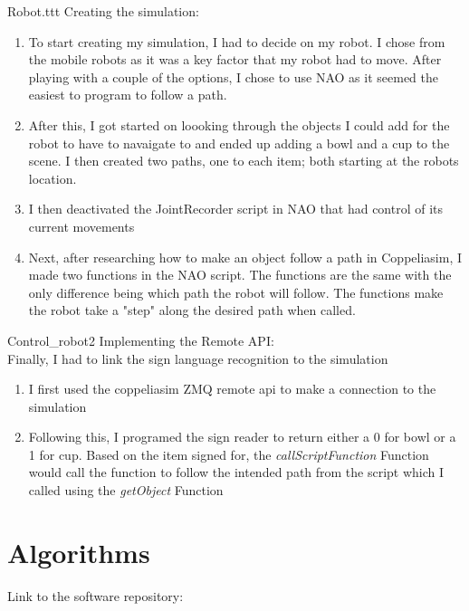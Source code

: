 \documentclass[lettersize,journal]{IEEEtran}
\begin{document}
Robot.ttt Creating the simulation: 
\begin{enumerate}
\item{ To start creating my simulation, I had to decide on my robot. I chose from the mobile robots as it was a key factor that my robot had to move. After playing with a couple of the options, I chose to use NAO as it seemed the easiest to program to follow a path.   }
\item{ After this, I got started on loooking through the objects I could add for the robot to have to navaigate to and ended up adding a bowl and a cup to the scene. I then created two paths, one to each item; both starting at the robots location.}
\item{I then deactivated the JointRecorder script in NAO that had control of its current movements }
\item{Next, after researching how to make an object follow a path in Coppeliasim, I made two functions in the NAO script. The functions are the same with the only difference being which path the robot will follow. The functions make the robot take a "step" along the desired path when called.  }
\end{enumerate}

Control\_robot2 Implementing the Remote API: 
\\
Finally, I had to link the sign language recognition to the simulation 
\begin{enumerate}
\item{ I first used the coppeliasim ZMQ remote api to make a connection to the simulation}
\item{Following this,  I programed the sign reader to return either a 0 for bowl or a 1 for cup. Based on the item signed for, the {\it{ callScriptFunction}} Function would call the function to follow the intended path from the script which I called using the {\it{ getObject} }Function }

\end{enumerate}


\section{Algorithms}


Link to the software repository:
\end{document}
